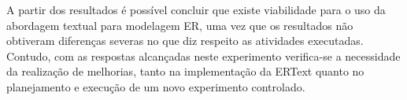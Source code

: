 A partir dos resultados é possível concluir que existe viabilidade para o uso da abordagem textual para modelagem \ac{ER}, uma vez que os resultados não obtiveram diferenças severas no que diz respeito as atividades executadas.
Contudo, com as respostas alcançadas neste experimento verifica-se a necessidade da realização de melhorias, tanto na implementação da ERText quanto no planejamento e execução de um novo experimento controlado.

